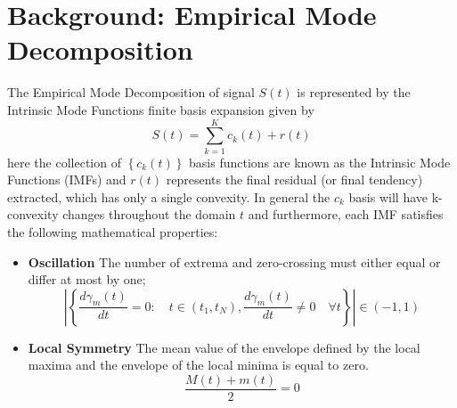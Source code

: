 \section{Background: Empirical Mode Decomposition}\label{sec:EMD_background}


\begin{Definition}
The Empirical Mode Decomposition of signal $S(t)$ is represented by the Intrinsic Mode Functions finite basis expansion given by
\begin{equation}
\label{EMD-for}
S(t) = \sum_{k=1}^K c_k \left(t\right) + r \left(t \right)
\end{equation}
here the collection of $\left\{c_k(t)\right\}$ basis functions are known as the Intrinsic Mode Functions (IMFs) and $r \left(t \right)$ represents the final residual (or final tendency) extracted, which has only a single convexity. In general the $c_k$ basis will have k-convexity changes throughout the domain $t$ and furthermore, each IMF satisfies the following mathematical properties:
\begin{itemize}
\item \textbf{Oscillation} The number of extrema and zero-crossing must either equal or differ at most by one;
\begin{equation}
\left| \left\{ \frac{d \gamma_m (t)}{dt} = 0 : \quad t \in \left( t_1, t_N \right), \frac{d \gamma_m (t)}{dt} \neq 0 \quad \forall t    \right\} \right|  \in  \left( -1, 1 \right)
\end{equation}
\item \textbf{Local Symmetry} The mean value of the envelope defined by the local maxima and the envelope of the local minima is equal to zero.  
\begin{equation}
\frac{M(t) + m(t)}{2} = 0
\end{equation}
\end{itemize}
\end{Definition}